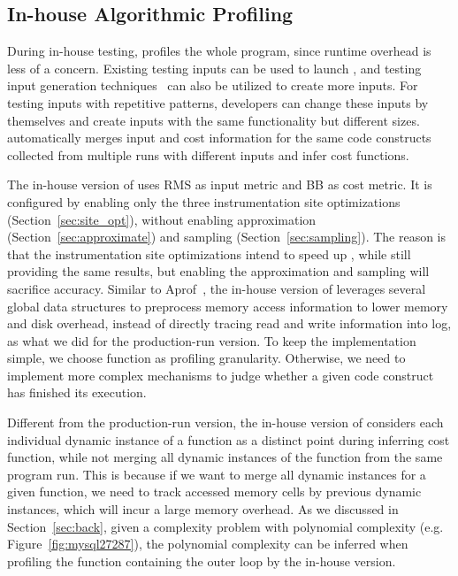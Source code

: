 \subsection{In-house Algorithmic Profiling}
\label{sec:in-house}

During in-house testing, \Tool profiles the whole program, 
since runtime overhead is less of a concern. 
Existing testing inputs can be used to launch \Tool, 
and testing input generation techniques~\cite{KLEE,dart,s2e} 
can also be utilized to create more inputs.
For testing inputs with repetitive patterns, 
developers can change these inputs by themselves 
and create inputs with the same functionality but different sizes. 
\Tool automatically merges input and cost information 
for the same code constructs
collected from multiple runs with different inputs and infer cost functions. 


The in-house version of \Tool uses RMS as input metric and BB
as cost metric.
It is configured by enabling only the three instrumentation site optimizations 
(Section~\ref{sec:site_opt}), without enabling approximation (Section~\ref{sec:approximate})
and sampling (Section~\ref{sec:sampling}). 
The reason is that the instrumentation site optimizations intend to speed up \Tool, 
while still providing the same results, 
but enabling the approximation and sampling will sacrifice accuracy. 
Similar to Aprof~\cite{Aprof1,Aprof2}, 
the in-house version of \Tool leverages several global data structures
to preprocess memory access information to lower memory and disk overhead,
instead of directly tracing read and write information into log, 
as what we did for the production-run version. 
To keep the implementation simple, 
we choose function as profiling granularity.
Otherwise, we need to implement more complex 
mechanisms to judge whether a given code construct 
has finished its execution.  

Different from the production-run version, the in-house version of \Tool 
considers each individual dynamic instance of a function 
as a distinct point during inferring cost function, 
while not merging all dynamic instances of the function 
from the same program run.
This is because if we want to merge all dynamic instances for a given function, 
we need to track accessed memory cells by previous dynamic instances, 
which will incur a large memory overhead. 
As we discussed in Section~\ref{sec:back}, 
given a complexity problem with polynomial complexity 
(e.g. Figure~\ref{fig:mysql27287}),  
the polynomial complexity can be inferred when profiling 
the function containing the outer loop by the in-house version.

